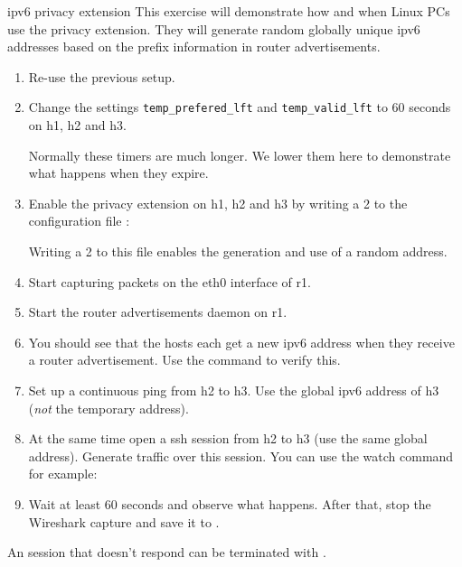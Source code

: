 \begin{exercise}{\acs{ipv6} privacy extension}
This exercise will demonstrate how and when Linux PCs use the privacy extension. They will generate random globally unique \acs{ipv6} addresses based on the prefix information in router advertisements.
	
\begin{enumerate}
	\item Re-use the previous setup.
	\item Change the settings \texttt{temp\_prefered\_lft} and \texttt{temp\_valid\_lft} to 60 seconds on h1, h2 and h3.
	\begin{cmdblock}[gobble=2]
	\end{cmdblock}
	Normally these timers are much longer. We lower them here to demonstrate what happens when they expire.
	\item Enable the privacy extension on h1, h2 and h3 by writing a 2 to the configuration file :
	\begin{cmdblock}[gobble=2]
	\end{cmdblock}
	Writing a 2 to this file enables the generation and use of a random address.
	\item Start capturing packets on the eth0 interface of r1.
	\item Start the router advertisements daemon on r1.
	\item You should see that the hosts each get a new \acs{ipv6} address when they receive a router advertisement. Use the command  to verify this.
	\item Set up a continuous ping from h2 to h3. Use the global \acs{ipv6} address of h3 (\emph{not} the temporary address).
	\item At the same time open a ssh session from h2 to h3 (use the same global address). Generate traffic over this session. You can use the watch command for example:
	\begin{cmdblock}[gobble=2]
	\end{cmdblock}
	\item Wait at least 60 seconds and observe what happens. After that, stop the Wireshark capture and save it to .
\end{enumerate}

\remark An session that doesn't respond can be terminated with .
	

\end{exercise}
